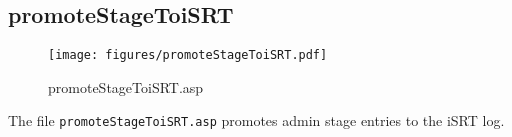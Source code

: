 \subsection{promoteStageToiSRT}
\begin{figure}[htb]
    \begin{center}
        \texttt{[image: figures/promoteStageToiSRT.pdf]}
    \end{center}
    \caption{promoteStageToiSRT.asp}
    \label{fig:promoteStageToiSRT}
\end{figure}

The file \verb|promoteStageToiSRT.asp| promotes admin stage entries to the iSRT
log.
